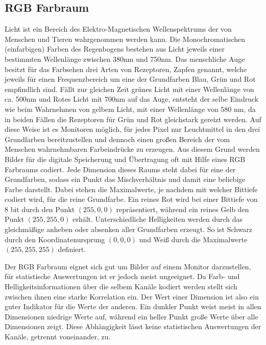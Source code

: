 \subsection{RGB Farbraum}

Licht ist ein Bereich des Elektro-Magnetischen Wellenspektrums der von Menschen und Tieren wahrgenommen werden kann. Die Monochromatischen (einfarbigen) Farben des Regenbogens bestehen aus Licht jeweils einer bestimmten Wellenlänge zwischen 380nm und 750nm. Das menschliche Auge besitzt für das Farbsehen drei Arten von Rezeptoren, Zapfen genannt, welche jeweils für einen Frequenzbereich um eine der Grundfarben Blau, Grün und Rot empfindlich sind. Fällt zur gleichen Zeit grünes Licht mit einer Wellenlänge von ca. 500nm und Rotes Licht mit 700nm auf das Auge, entsteht der selbe Eindruck wie beim Wahrnehmen von gelbem Licht, mit einer Wellenlänge von 580 nm, da in beiden Fällen die Rezeptoren für Grün und Rot gleichstark gereizt werden. Auf diese Weise ist es Monitoren möglich, für jedes Pixel nur Leuchtmittel in den drei Grundfarben bereitzustellen und dennoch einen großen Bereich der vom Menschen wahrnehmbaren Farbeindrücke zu erzeugen. Aus diesem Grund werden Bilder für die digitale Speicherung und Übertragung oft mit Hilfe eines RGB Farbraums codiert. Jede Dimension dieses Raums steht dabei für eine der Grundfarben, sodass ein Punkt das Mischverhältnis und damit eine beliebige Farbe darstellt. Dabei stehen die Maximalwerte, je nachdem mit welcher Bittiefe codiert wird, für die reine Grundfarbe. Ein reines Rot wird bei einer Bittiefe von 8 bit durch den Punkt $\left(255, 0, 0\right)$ repräsentiert, während ein reines Gelb den Punkt $ \left(255, 255, 0\right) $ erhält. Unterschiedliche Helligkeiten werden durch das gleichmäßige anheben oder absenken aller Grundfarben erzeugt. So ist Schwarz durch den Koordinatenursprung $ \left(0, 0, 0\right) $ und Weiß durch die Maximalwerte $ \left(255, 255, 255\right) $ definiert.

Der RGB Farbraum eignet sich gut um Bilder auf einem Monitor darzustellen, für statistische Auswertungen ist er jedoch meist ungeeignet. Da Farb- und Helligkeitsinformationen über die selbem Kanäle kodiert werden stellt sich zwischen ihnen eine starke Korrelation ein. Der Wert einer Dimension ist also ein guter Indikator für die Werte der anderen. Ein dunkler Punkt weist meist in allen Dimensionen niedrige Werte auf, während ein heller Punkt große Werte über alle Dimensionen zeigt. Diese Abhängigkeit lässt keine statistischen Auswertungen der Kanäle, getrennt voneinander, zu.

